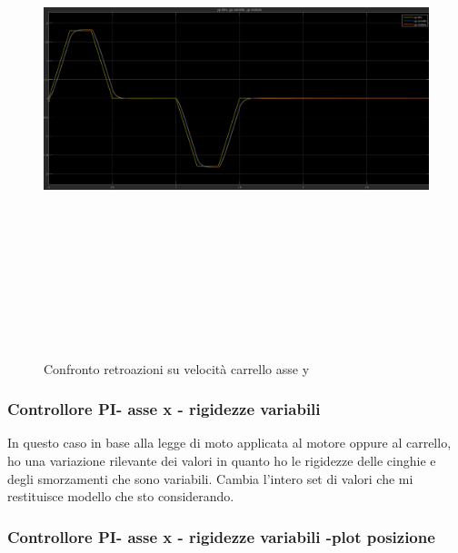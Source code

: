 \documentclass{article}
\begin{document}
\begin{figure}[H]
\centering
\includegraphics[width=13cm,height=15cm,keepaspectratio]{./simulink/ldm_rigido/PIDY1_VELOCITA}
\caption{Confronto retroazioni su velocità carrello asse y}
\end{figure}
\subsubsection{Controllore PI- asse x - rigidezze variabili}
In questo caso in base alla legge di moto applicata al motore oppure al carrello, ho una variazione rilevante dei valori in quanto ho 
le rigidezze delle cinghie e degli smorzamenti che sono variabili. Cambia l'intero set di valori  che mi restituisce modello che sto considerando.

\subsubsection{Controllore PI- asse x  - rigidezze variabili -plot posizione}
\end{document}

